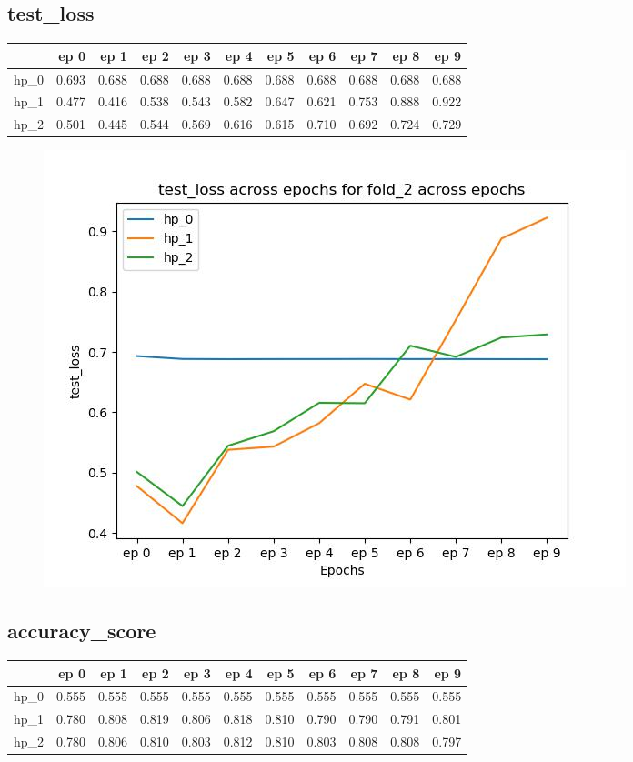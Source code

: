 \documentclass{article}
\begin{document}
\subsection{test\_loss}
\begin{tabular}{lrrrrrrrrrr}
\toprule
{} &   ep 0 &   ep 1 &   ep 2 &   ep 3 &   ep 4 &   ep 5 &   ep 6 &   ep 7 &   ep 8 &   ep 9 \\
\midrule
hp\_0 &  0.693 &  0.688 &  0.688 &  0.688 &  0.688 &  0.688 &  0.688 &  0.688 &  0.688 &  0.688 \\
hp\_1 &  0.477 &  0.416 &  0.538 &  0.543 &  0.582 &  0.647 &  0.621 &  0.753 &  0.888 &  0.922 \\
hp\_2 &  0.501 &  0.445 &  0.544 &  0.569 &  0.616 &  0.615 &  0.710 &  0.692 &  0.724 &  0.729 \\
\bottomrule
\end{tabular}

\begin{figure}[H]
\includegraphics[scale = 0.75]{fold_2/test_loss}
\end{figure}
\subsection{accuracy\_score}
\begin{tabular}{lrrrrrrrrrr}
\toprule
{} &   ep 0 &   ep 1 &   ep 2 &   ep 3 &   ep 4 &   ep 5 &   ep 6 &   ep 7 &   ep 8 &   ep 9 \\
\midrule
hp\_0 &  0.555 &  0.555 &  0.555 &  0.555 &  0.555 &  0.555 &  0.555 &  0.555 &  0.555 &  0.555 \\
hp\_1 &  0.780 &  0.808 &  0.819 &  0.806 &  0.818 &  0.810 &  0.790 &  0.790 &  0.791 &  0.801 \\
hp\_2 &  0.780 &  0.806 &  0.810 &  0.803 &  0.812 &  0.810 &  0.803 &  0.808 &  0.808 &  0.797 \\
\bottomrule
\end{tabular}
\end{document}
